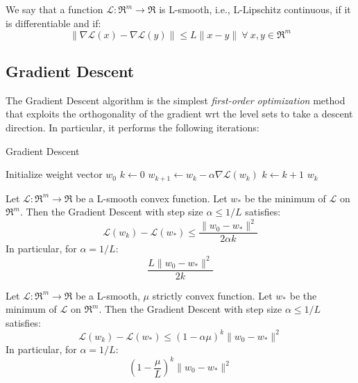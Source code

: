 \begin{definition}[L-smoothness]
We say that a function $\mathcal{L}: \Re^m \rightarrow \Re$ is L-smooth, i.e., L-Lipschitz continuous, if it is differentiable and if:
$$
\| \nabla \mathcal{L}(x) - \nabla \mathcal{L}(y) \| \leq L \| x - y \| \ \forall \ x, y \in \Re^m
$$
\end{definition}

\subsection{Gradient Descent}

The Gradient Descent algorithm is the simplest \emph{first-order optimization} method that exploits the orthogonality of the gradient wrt the level sets to take a descent direction. In particular, it performs the following iterations:

\begin{algorithm}[H]
	\caption{Gradient Descent}
	\label{alg:gd}
	\begin{algorithmic}
			\State Initialize weight vector $w_0$
			\State $k \gets 0$
				\State $w_{k+1} \gets w_k - \alpha \nabla \mathcal{L}(w_k)$
				\State $k \gets k + 1$
			\EndWhile
			\State \Return $w_k$
		\EndFunction
	\end{algorithmic}
\end{algorithm}

\begin{theorem}
Let $\mathcal{L}: \Re^m \rightarrow \Re$ be a L-smooth convex function. Let $w_*$ be the minimum of $\mathcal{L}$ on $\Re^m$. Then the Gradient Descent with step size $\alpha \leq 1/L$ satisfies:
$$
\mathcal{L}(w_k) - \mathcal{L}(w_*) \leq \frac{\| w_0 - w_* \|^2}{2 \alpha k}
$$
In particular, for $\alpha = 1/L$:
$$
\frac{L \| w_0 - w_* \|^2}{2 k}
$$
\end{theorem}

\begin{theorem}
Let $\mathcal{L}: \Re^m \rightarrow \Re$ be a L-smooth, $\mu$ strictly convex function. Let $w_*$ be the minimum of $\mathcal{L}$ on $\Re^m$. Then the Gradient Descent with step size $\alpha \leq 1/L$ satisfies:
$$
\mathcal{L}(w_k) - \mathcal{L}(w_*) \leq (1 - \alpha \mu)^k \| w_0 - w_* \|^2
$$
In particular, for $\alpha = 1/L$:
$$
(1 - \frac{\mu}{L})^k \| w_0 - w_* \|^2
$$
\end{theorem}

